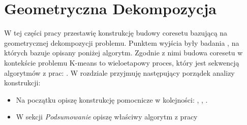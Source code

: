 \chapter{Geometryczna Dekompozycja}\label{geo}
W tej części pracy przestawię konstrukcję budowy coresetu bazującą na geometrycznej dekompozycji problemu.
Punktem wyjścia były badania \cite{DBLP:journals/ki/MunteanuS18}, na których bazuje opisany poniżej algorytm.
Zgodnie z nimi budowa coresetu w kontekście problemu K-means to wieloetapowy proces, który jest sekwencją algorytmów z prac: \cite{Gonzalez1985ClusteringTM} \cite{10.1145/1007352.1007400} \cite{Arya2004LocalSH} \cite{DBLP:journals/ki/MunteanuS18}.
W rozdziale przyjmuję następujący porządek analizy konstrukcji:
\begin{itemize}
    \item Na początku opiszę konstrukcję pomocnicze w kolejności: \cite{Gonzalez1985ClusteringTM}, \cite{10.1145/1007352.1007400}, \cite{Arya2004LocalSH}.
    \item W sekcji \textit{Podsumowanie} opiszę właściwy algorytm z pracy \cite{DBLP:journals/ki/MunteanuS18}
\end{itemize}





